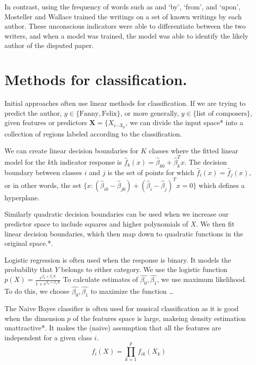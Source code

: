 \documentclass[12pt,twoside]{reedthesis}
\theoremstyle{definition}
\theoremstyle{definition}
\theoremstyle{definition}
\theoremstyle{remark}
\begin{document}
In contrast, using the frequency of words such as and `by', `from', and
`upon', Mosteller and Wallace trained the writings on a set of known
writings by each author. These unconscious indicators were able to
differentiate between the two writers, and when a model was trained, the
model was able to identify the likely author of the disputed paper.

\section{Methods for classification.}\label{methods-for-classification.}

Initial approaches often use linear methods for classification. If we
are trying to predict the author,
\(y \in \{\text{Fanny},\text{Felix}\}\), or more generally,
\(y \in \{\text{list of composers}\}\), given features or predictors
\(\textbf{X} = \{X_{i \cdots X_p}\), we can divide the input space* into
a collection of regions labeled according to the classification.

We can create linear decision boundaries for \(K\) classes where the
fitted linear model for the \(k\)th indicator response is
\(\hat{f}_k(x) = \hat{\beta}_{k0} + \hat{\beta}_{k}^Tx.\) The decision
boundary between classes \(i\) and \(j\) is the set of points for which
\(\hat{f}_i(x) = \hat{f}_j(x)\), or in other words, the set
\(\{x : (\hat{\beta}_{i0} - \hat{\beta}_{j0}) + (\hat{\beta}_{i} - \hat{\beta}_j)^Tx = 0 \}\)
which defines a hyperplane.

Similarly quadratic decision boundaries can be used when we increase our
predictor space to include squares and higher polynomials of \(X\). We
then fit linear decision boundaries, which then map down to quadratic
functions in the original space.*.

Logistic regression is often used when the response is binary. It models
the probability that \(Y\) belongs to either category. We use the
logistic function
\(p(X) = \frac{e^{\beta_0 + \beta_1X}}{1 + e^{\beta_0 + \beta_1X}}\) To
calculate estimates of \(\hat{\beta_0},\hat{\beta_1}\), we use maximum
likelihood. To do this, we choose \(\hat{\beta_0},\hat{\beta_1}\) to
maximize the function \ldots{}

The Naive Bayes classifier is often used for musical classification as
it is good when the dimension \(p\) of the features space is large,
makeing density estimation unattractive*. It makes the (naive)
assumption that all the features are independent for a given class
\(i\). \[f_i(X) = \prod_{k = 1}^p f_{ik}(X_k)\]
\end{document}
